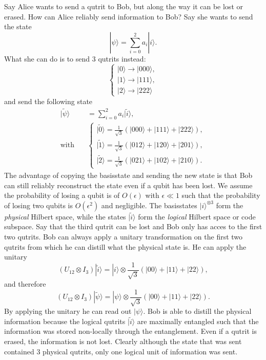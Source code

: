 \documentclass{PoS}
\newcommand{\ket}[1]{|#1\rangle}
\newcommand{\LF}{\left(}
\newcommand{\RF}{\right)}
\begin{document}
Say Alice wants to send a qutrit to Bob, but along the way it can be lost or erased. How can Alice reliably send information to Bob? Say she wants to send the state
\begin{equation}
\ket{\psi} = \sum\limits_{i=0}^2 a_i \ket{i}.
\end{equation}
What she can do is to send $3$ qutrits instead:
\begin{equation}
\left\{ \begin{matrix}
\ket{0}\rightarrow \ket{000},\\
\ket{1}\rightarrow \ket{111},\\
\ket{2}\rightarrow \ket{222}
\end{matrix}
\right.
\end{equation}
and send the following state
\begin{align}
\ket{\tilde{\psi}} &= \sum\limits_{i=0}^{2} a_i \ket{\tilde{i}},\\
\text{with} \quad & \left\{
\begin{matrix}
\ket{\tilde{0}} = \frac{1}{\sqrt{3}} \LF \ket{000} + \ket{111} + \ket{222}\RF,\\
\ket{\tilde{1}} = \frac{1}{\sqrt{3}}\LF \ket{012}+ \ket{120} + \ket{201}\RF,\\
\ket{\tilde{2}} = \frac{1}{\sqrt{3}}\LF \ket{021} + \ket{102} + \ket{210}\RF.
\end{matrix}
\right.
\end{align}
The advantage of copying the basisstate and sending the new state is that Bob can still reliably reconstruct the state even if a qubit has been lost. We assume the probability of losing a qubit is of $O(\epsilon)$ with $\epsilon \ll 1$ such that the probability of losing two qubits is $O(\epsilon^2)$ and negligible. The basisstates $\ket{i}^{\otimes 3}$ form the \textit{physical} Hilbert space, while the states $\ket{\tilde{i}}$ form the \textit{logical} Hilbert space or code subspace.  Say that the third qutrit can be lost and Bob only has acces to the first two qutrits. Bob can always apply a unitary transformation on the first two qutrits from which he can distill what the physical state is. He can apply the unitary
\begin{equation}
\LF U_{12}\otimes I_3 \RF \ket{\tilde{i}} = \ket{i} \otimes \frac{1}{\sqrt{3}}\LF \ket{00} + \ket{11} + \ket{22}\RF, 
\end{equation}
and therefore
\begin{equation}
\LF U_{12}\otimes I_3 \RF \ket{\tilde{\psi}} = \ket{\psi} \otimes \frac{1}{\sqrt{3}}\LF \ket{00} + \ket{11}+\ket{22}\RF.
\end{equation}  
By applying the unitary he can read out $\ket{\psi}$. Bob is able to distill the physical information because the logical qutrits $\ket{\tilde{i}}$ are maximally entangled such that the information was stored non-locally through the entanglement. Even if a qutrit is erased, the information is not lost. Clearly although the state that was sent contained $3$ physical qutrits, only one logical unit of information was sent.\\
\end{document}
